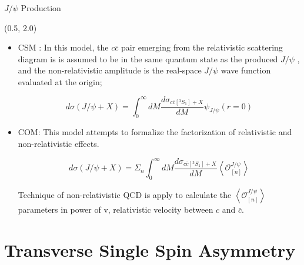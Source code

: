 \documentclass[10pt, xcolor={dvipsnames}, aspectratio = 169]{beamer}
\newcommand{\jpsi}{$J/\psi$ }
\begin{document}
\begin{frame}{\jpsi Production}

\begin{textblock}{14.0}(0.5, 2.0)
\begin{itemize}

\item CSM : In this model, the $c\bar{c}$ pair emerging from the relativistic scattering diagram is  is assumed to be in the same quantum state as the produced \jpsi, and the non-relativistic amplitude is the real-space \jpsi wave function evaluated at the origin;

\begin{equation*}
d\sigma (J/\psi+X) = \int_{0}^{\infty} dM \frac{d\sigma_{c\bar{c}[^{3}S_{1}] + X}}{dM} \psi_{J/\psi} (r=0)
\end{equation*}

\item COM: This model attempts to formalize the factorization of relativistic
and non-relativistic effects.

\begin{equation*}
d\sigma (J/\psi+X) = \Sigma_{n} \int_{0}^{\infty} dM \frac{d\sigma_{c\bar{c}[^{3}S_{1}] + X}}{dM} \left<\mathcal{O}^{J/\psi}_{[n]}\right>
\end{equation*}

Technique of non-relativistic QCD is apply to calculate the $\left<\mathcal{O}^{J/\psi}_{[n]}\right>$ parameters in power of v, relativistic velocity between $c$ and $\bar{c}$.

\end{itemize}
\end{textblock}

\end{frame}

%
%
\section{Transverse Single Spin Asymmetry}
\end{document}
